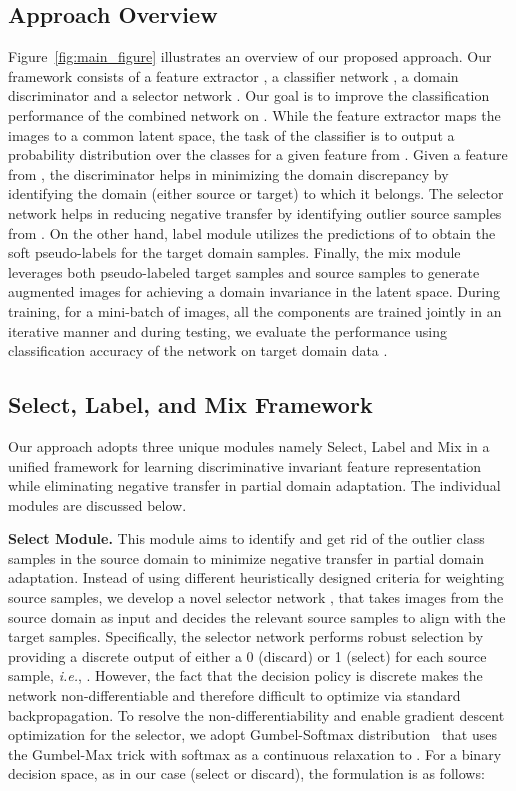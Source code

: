 \documentclass[10pt,twocolumn,letterpaper]{article}
\begin{document}
\subsection{Approach Overview}
Figure~\ref{fig:main_figure} illustrates an overview of our proposed approach. Our framework consists of a feature extractor , a classifier network , a domain discriminator  and a selector network . Our goal is to improve the classification performance of the combined network  on . While the feature extractor  maps the images to a common latent space, the task of the classifier  is to output a probability distribution over the classes for a given feature from . Given a feature from , the discriminator  helps in minimizing the domain discrepancy by identifying the domain (either source or target) to which it belongs. The selector network  helps in reducing negative transfer by identifying outlier source samples from . On the other hand, label module utilizes the predictions of  to obtain the soft pseudo-labels for the target domain samples. Finally, the mix module leverages both pseudo-labeled target samples and source samples to generate augmented images for achieving a domain invariance in the latent space. During training, for a mini-batch of images, all the components are trained jointly in an iterative manner and during testing, we evaluate the performance using classification accuracy of the network  on target domain data .


\subsection{Select, Label, and Mix Framework} Our approach adopts three unique modules namely Select, Label and Mix in a unified framework for learning discriminative invariant feature representation while eliminating negative transfer in partial domain adaptation.
The individual modules are discussed below.


\vspace{1mm}
\noindent\textbf{Select Module.}
This module aims to identify and get rid of the outlier class samples in the source domain to minimize negative transfer in partial domain adaptation. Instead of using different heuristically designed criteria for weighting source samples, we develop a novel selector network , that takes images from the source domain as input and decides the relevant source samples to align with the target samples. 
Specifically, the selector network  performs robust selection by providing a discrete output of either a 0 (discard) or 1 (select) for each source sample, \textit{i.e.}, . 
However,  the fact that the decision policy is discrete makes the network non-differentiable and therefore difficult to optimize via standard backpropagation.
To resolve the non-differentiability and enable gradient descent optimization for the selector, we adopt Gumbel-Softmax distribution~\cite{jang2016categorical, maddison2016concrete} that uses the Gumbel-Max trick with softmax as a continuous relaxation to . For a binary decision space, as in our case (select or discard), the formulation is as follows: 
\end{document}
